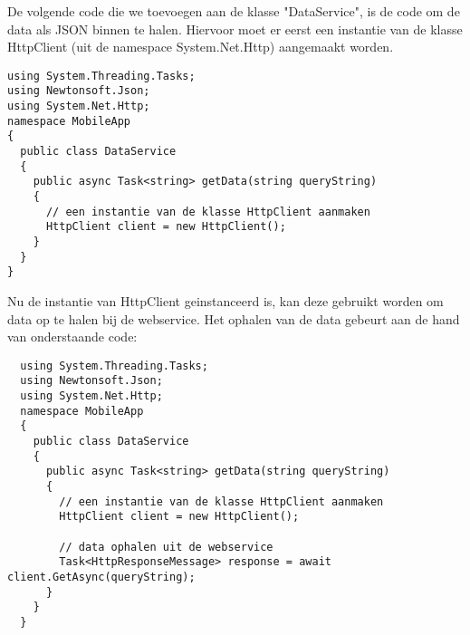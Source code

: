 De volgende code die we toevoegen aan de klasse "DataService", is de code om de data als JSON binnen te halen.
Hiervoor moet er eerst een instantie van de klasse HttpClient (uit de namespace System.Net.Http) aangemaakt worden.
\begin{lstlisting}
using System.Threading.Tasks;
using Newtonsoft.Json;
using System.Net.Http;
namespace MobileApp
{
  public class DataService
  {
    public async Task<string> getData(string queryString)
    {
      // een instantie van de klasse HttpClient aanmaken
      HttpClient client = new HttpClient();
    }
  }
}
\end{lstlisting}
Nu de instantie van HttpClient geinstanceerd is, kan deze gebruikt worden om data op te halen bij de webservice.
Het ophalen van de data gebeurt aan de hand van onderstaande code:
\begin{lstlisting}
  using System.Threading.Tasks;
  using Newtonsoft.Json;
  using System.Net.Http;
  namespace MobileApp
  {
    public class DataService
    {
      public async Task<string> getData(string queryString)
      {
        // een instantie van de klasse HttpClient aanmaken
        HttpClient client = new HttpClient();

        // data ophalen uit de webservice
        Task<HttpResponseMessage> response = await client.GetAsync(queryString);
      }
    }
  }
\end{lstlisting}

